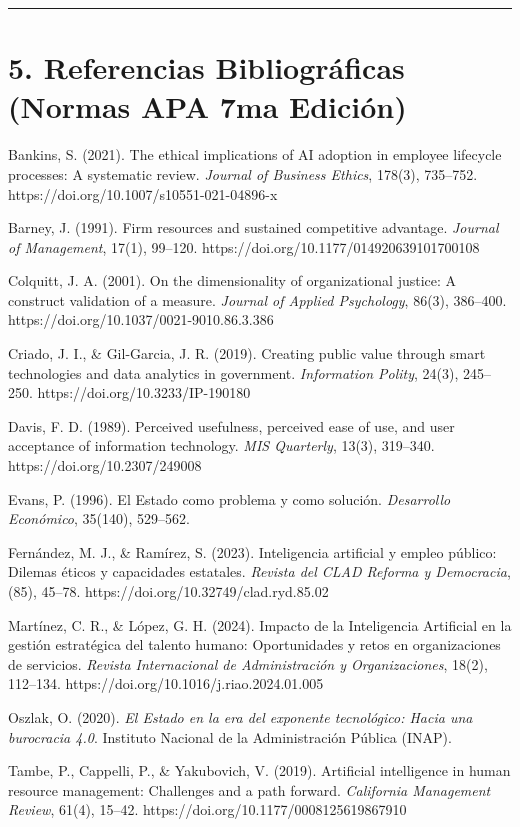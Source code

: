 \documentclass[
  spanish,
  letterpaper,
  DIV=11,
  numbers=noendperiod]{scrartcl}
\begin{document}
\begin{center}\rule{0.5\linewidth}{0.5pt}\end{center}

\section{5. Referencias Bibliográficas (Normas APA 7ma
Edición)}\label{referencias-bibliogruxe1ficas-normas-apa-7ma-ediciuxf3n}

Bankins, S. (2021). The ethical implications of AI adoption in employee
lifecycle processes: A systematic review. \emph{Journal of Business
Ethics}, 178(3), 735--752. https://doi.org/10.1007/s10551-021-04896-x

Barney, J. (1991). Firm resources and sustained competitive advantage.
\emph{Journal of Management}, 17(1), 99--120.
https://doi.org/10.1177/014920639101700108

Colquitt, J. A. (2001). On the dimensionality of organizational justice:
A construct validation of a measure. \emph{Journal of Applied
Psychology}, 86(3), 386--400. https://doi.org/10.1037/0021-9010.86.3.386

Criado, J. I., \& Gil-Garcia, J. R. (2019). Creating public value
through smart technologies and data analytics in government.
\emph{Information Polity}, 24(3), 245--250.
https://doi.org/10.3233/IP-190180

Davis, F. D. (1989). Perceived usefulness, perceived ease of use, and
user acceptance of information technology. \emph{MIS Quarterly}, 13(3),
319--340. https://doi.org/10.2307/249008

Evans, P. (1996). El Estado como problema y como solución.
\emph{Desarrollo Económico}, 35(140), 529--562.

Fernández, M. J., \& Ramírez, S. (2023). Inteligencia artificial y
empleo público: Dilemas éticos y capacidades estatales. \emph{Revista
del CLAD Reforma y Democracia}, (85), 45--78.
https://doi.org/10.32749/clad.ryd.85.02

Martínez, C. R., \& López, G. H. (2024). Impacto de la Inteligencia
Artificial en la gestión estratégica del talento humano: Oportunidades y
retos en organizaciones de servicios. \emph{Revista Internacional de
Administración y Organizaciones}, 18(2), 112--134.
https://doi.org/10.1016/j.riao.2024.01.005

Oszlak, O. (2020). \emph{El Estado en la era del exponente tecnológico:
Hacia una burocracia 4.0}. Instituto Nacional de la Administración
Pública (INAP).

Tambe, P., Cappelli, P., \& Yakubovich, V. (2019). Artificial
intelligence in human resource management: Challenges and a path
forward. \emph{California Management Review}, 61(4), 15--42.
https://doi.org/10.1177/0008125619867910
\end{document}
